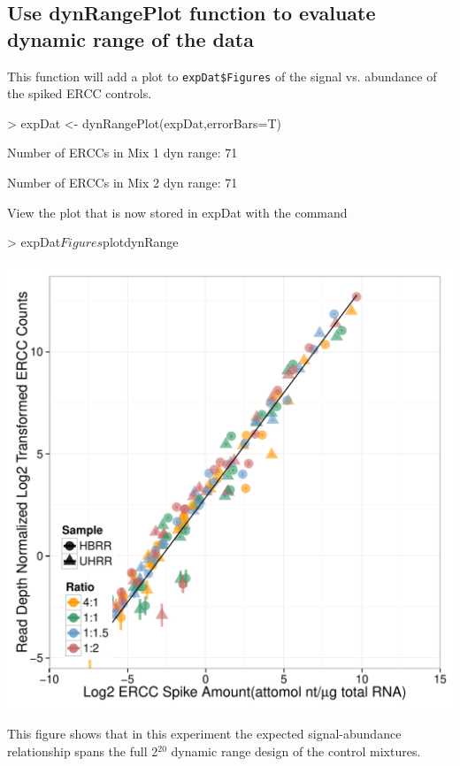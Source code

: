 \documentclass{article}
\begin{document}
\subsection{Use dynRangePlot function to evaluate dynamic range of the data}
This function will add a plot to \verb|expDat$Figures|
of the signal vs. abundance of the spiked ERCC controls.
\begin{center}
\begin{Schunk}
\begin{Sinput}
> expDat <- dynRangePlot(expDat,errorBars=T)
\end{Sinput}
\begin{Soutput}
Number of ERCCs in Mix 1 dyn range:  71 

Number of ERCCs in Mix 2 dyn range:  71 
\end{Soutput}
\end{Schunk}
\end{center}
View the plot that is now stored in expDat with the command
\clearpage
\begin{center}
\begin{Schunk}
\begin{Sinput}
> expDat$Figures$plotdynRange
\end{Sinput}
\end{Schunk}
\includegraphics{erccdashboardVignette-printPanelD}
\end{center}
This figure shows that in this experiment the expected signal-abundance
relationship spans the full 2$^{20}$ dynamic range design of the control mixtures.
\end{document}

